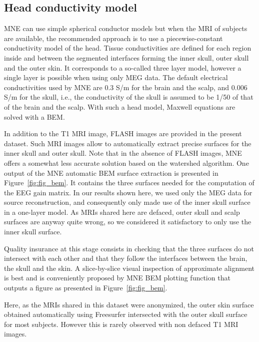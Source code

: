 \subsection{Head conductivity model}
MNE can use simple spherical conductor models but when the MRI of subjects are available, the recommended approach is to use a piecewise-constant conductivity model of the head. Tissue conductivities are defined for each region inside and between the segmented interfaces forming the inner skull, outer skull and the outer skin. It corresponds to a so-called three layer model, however a single layer is possible when using only MEG data. The default electrical conductivities used by MNE are 0.3 S/m for the brain and the scalp, and 0.006 S/m for the skull, i.e., the conductivity of the skull is assumed to be 1/50 of that of the brain and the scalp. With such a head model, Maxwell equations are solved with a \ac{BEM}.

In addition to the T1 MRI image, \ac{FLASH} images are provided in the present dataset. Such MRI images allow to automatically extract precise surfaces for the inner skull and outer skull. Note that in the absence of FLASH images, MNE offers a somewhat less accurate solution based on the watershed algorithm. One output of the MNE automatic BEM surface extraction is presented in Figure~\ref{fig:fig_bem}. It contains the three surfaces needed for the computation of the EEG gain matrix. In our results shown here, we used only the MEG data for source reconstruction, and consequently only made use of the inner skull surface in a one-layer model. As MRIs shared here are defaced, outer skull and scalp surfaces are anyway quite wrong, so we considered it satisfactory to only use the inner skull surface.

Quality insurance at this stage consists in checking that the three surfaces do not intersect with each other and that they follow the interfaces between the brain, the skull and the skin. A slice-by-slice visual inspection of approximate alignment is best and is conveniently proposed by MNE BEM plotting function that outputs a figure as presented in Figure~\ref{fig:fig_bem}.

Here, as the MRIs shared in this dataset were anonymized, the outer skin surface obtained automatically using Freesurfer intersected with the outer skull surface for most subjects. However this is  rarely observed with non defaced T1 MRI images.

